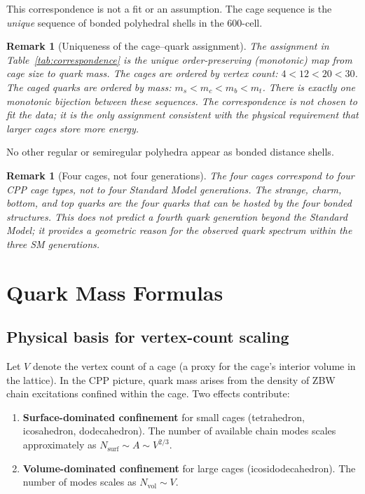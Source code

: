 \documentclass[11pt,letterpaper]{article}
\newtheorem{remark}[theorem]{Remark}
\begin{document}
This correspondence is not a fit or an assumption.  The cage
sequence is the \emph{unique} sequence of bonded polyhedral shells
in the 600-cell.

\begin{remark}[Uniqueness of the cage--quark assignment]
The assignment in Table~\ref{tab:correspondence} is the unique
order-preserving (monotonic) map from cage size to quark mass.
The cages are ordered by vertex count: $4 < 12 < 20 < 30$.  The
caged quarks are ordered by mass: $m_s < m_c < m_b < m_t$.  There
is exactly one monotonic bijection between these sequences.  The
correspondence is not chosen to fit the data; it is the only
assignment consistent with the physical requirement that larger
cages store more energy.
\end{remark}

No other regular or semiregular polyhedra appear
as bonded distance shells.

\begin{remark}[Four cages, not four generations]
The four cages correspond to four CPP cage \emph{types}, not to
four Standard Model generations.  The strange, charm, bottom, and
top quarks are the four quarks that can be hosted by the four
bonded structures.  This does \emph{not} predict a fourth quark
generation beyond the Standard Model; it provides a geometric
reason for the observed quark spectrum within the three SM
generations.
\end{remark}

\section{Quark Mass Formulas}
\label{sec:mass}

\subsection{Physical basis for vertex-count scaling}

Let $V$ denote the vertex count of a cage (a proxy for the
cage's interior volume in the lattice).  In the CPP picture, quark
mass arises from the density of ZBW chain excitations confined
within the cage.  Two effects contribute:

\begin{enumerate}
\item \textbf{Surface-dominated confinement} for small cages
  (tetrahedron, icosahedron, dodecahedron).  The number of available
  chain modes scales approximately as
  $N_{\text{surf}} \sim A \sim V^{2/3}$.

\item \textbf{Volume-dominated confinement} for large cages
  (icosidodecahedron).  The number of modes scales as
  $N_{\text{vol}} \sim V$.
\end{enumerate}
\end{document}
